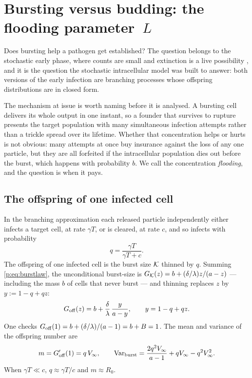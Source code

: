 \FloatBarrier

\section{Bursting versus budding: the flooding parameter~\texorpdfstring{$L$}{L}}
\label{p:sec:flooding}

Does bursting help a pathogen get established? The question belongs to the
stochastic early phase, where counts are small and extinction is a live
possibility \cite{pearson2011stochastic}, and it is the question the
stochastic intracellular model was built to answer: both versions of the
early infection are branching processes whose offspring distributions are in
closed form.

The mechanism at issue is worth naming before it is analysed. A bursting
cell delivers its whole output in one instant, so a founder that survives to
rupture presents the target population with many simultaneous infection
attempts rather than a trickle spread over its lifetime. Whether that
concentration helps or hurts is not obvious: many attempts at once buy
insurance against the loss of any one particle, but they are all forfeited
if the intracellular population dies out before the burst, which happens
with probability $b$. We call the concentration \emph{flooding}, and the
question is when it pays.

\subsection{The offspring of one infected cell}

In the branching approximation each released particle independently either
infects a target cell, at rate $\gamma T$, or is cleared, at rate $c$, and so
infects with probability
\begin{equation}
q=\frac{\gamma T}{\gamma T+c}.
\label{p:eq:q}
\end{equation}
The offspring of one infected cell is the burst size $\mathcal{K}$ thinned by $q$.
Summing \cref{p:eq:burstlaw}, the unconditional burst-size \pgf{} is
$G_{\mathcal{K}}(z)=b+(\delta/\lambda)z/(a-z)$ --- including the mass $b$ of cells
that never burst --- and thinning replaces $z$ by $y:=1-q+qz$:
\begin{equation}
G_{\rm off}(z)=b+\frac{\delta}{\lambda}\,\frac{y}{a-y},
\qquad y=1-q+qz.
\label{p:eq:Goff}
\end{equation}
One checks $G_{\rm off}(1)=b+(\delta/\lambda)/(a-1)=b+B=1$. The mean and
variance of the offspring number are
\begin{equation}
m=G_{\rm off}'(1)=q\,V_\infty,
\qquad
\mathrm{Var}_{\rm burst}
=\frac{2q^2V_\infty}{a-1}+qV_\infty-q^2V_\infty^2.
\label{p:eq:offmoments}
\end{equation}
When $\gamma T\ll c$, $q\approx\gamma T/c$ and $m\approx R_0$.

